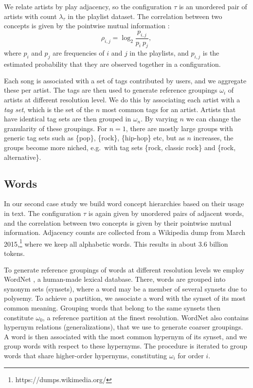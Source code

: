 \documentclass[conference]{IEEEtran}
\newcommand{\rn}[1]{\rho_{#1}}
\begin{document}
We relate artists by play adjacency, so the configuration $\tau$ is an unordered pair of artists
with count $\lambda_{\tau}$ in the playlist dataset. The correlation between two concepts is given by
the pointwise mutual information \cite{Church90}:
\begin{equation}\label{eq:pwmi}
\rn{i,j} = \log_2 \frac{p_{i,j}}{p_i\ p_j},
\end{equation}
where $p_i$ and $p_j$ are frequencies of $i$ and $j$ in the playlists, 
and $p_{i,j}$ is the estimated probability that they are observed together in a configuration.

Each song is associated with a set of tags contributed by users, and we aggregate these per artist.
The tags are then used to generate reference groupings $\omega_i$ of artists at different resolution level.
We do this by associating each artist with a \emph{tag set}, which is the set of the $n$
most common tags for an artist. Artists that have identical tag sets are then grouped in $\omega_n$.
By varying $n$ we can change the granularity of these groupings. For $n=1$, there are mostly 
large groups with generic tag sets such as \{pop\}, \{rock\}, \{hip-hop\} etc, but as $n$ increases, the groups
become more niched, e.g.\ with tag sets \{rock, classic rock\} and \{rock, alternative\}.

\subsection{Words}

In our second case study we build word concept hierarchies based on their usage in text. The configuration $\tau$
is again given by unordered pairs of adjacent words, and the correlation between 
two concepts is given by their pointwise mutual information. 
Adjacency counts are collected from a Wikipedia dump from March 2015,\footnote{https://dumps.wikimedia.org/}
where we keep all alphabetic words. This results in about 3.6 billion tokens. 

To generate reference groupings of words at different resolution levels we employ WordNet \cite{Miller1995}, 
a human-made lexical database. There, words are grouped into synonym sets (synsets),
where a word may be a member of several synsets due to polysemy. To achieve a partition, we 
associate a word with the synset of its most common meaning. Grouping words that belong to the same
synsets then constitute $\omega_0$, a reference partition at the finest resolution. 
WordNet also contains hypernym relations (generalizations), that we use to generate coarser
groupings. A word is then associated with the most common hypernym of its synset, and
we group words with respect to these hypernyms. The procedure is iterated to group
words that share higher-order hypernyms, constituting $\omega_i$ for order $i$. 
\end{document}

